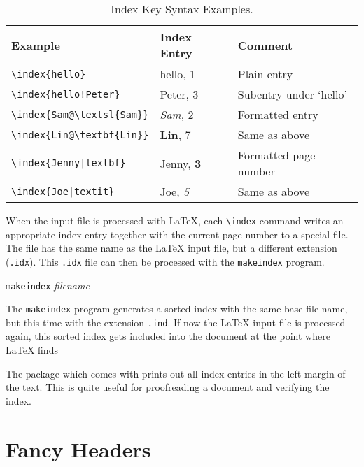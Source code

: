 \begin{table}[!tp]
\caption{Index Key Syntax Examples.}
\label{index}
\begin{center}
\begin{tabular}{@{}lll@{}}
  \textbf{Example} &\textbf{Index Entry} &\textbf{Comment}\\\hline
  \rule{0pt}{1.05em}\verb|\index{hello}| &hello, 1 &Plain entry\\ 
\verb|\index{hello!Peter}|   &\hspace*{2ex}Peter, 3 &Subentry under `hello'\\ 
\verb|\index{Sam@\textsl{Sam}}|     &\textsl{Sam}, 2& Formatted entry\\ 
\verb|\index{Lin@\textbf{Lin}}|     &\textbf{Lin}, 7& Same as above\\ 
\verb.\index{Jenny|textbf}.     &Jenny, \textbf{3}& Formatted page number\\
\verb.\index{Joe|textit}.     &Joe, \textit{5}& Same as above
\end{tabular}
\end{center}
\end{table}

When the input file is processed with \LaTeX{}, each \verb|\index|
command writes an appropriate index entry together with the current
page number to a special file. The file has the same name as the
\LaTeX{} input file, but a different extension (\verb|.idx|). This
\texttt{.idx} file can then be processed with the \texttt{makeindex}
program.

\begin{command}
  \texttt{makeindex} \emph{filename}
\end{command}
The \texttt{makeindex} program generates a sorted index with the same base
file name, but this time with the extension \texttt{.ind}. If now the
\LaTeX{} input file is processed again, this sorted index gets
included into the document at the point where \LaTeX{} finds
\begin{command}
\end{command}

The  package which comes with \LaTeXe{} prints out all
index entries in the left margin of the text. This is quite useful for
proofreading a document and verifying the index.
   


\section{Fancy Headers}
\label{sec:fancy}

